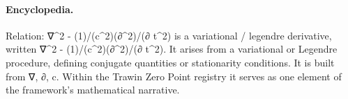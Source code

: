\paragraph{Encyclopedia.}
Relation: ∇\textasciicircum{}2 - (1)/(c\textasciicircum{}2)(∂\textasciicircum{}2)/(∂ t\textasciicircum{}2) is a variational / legendre derivative, written ∇\textasciicircum{}2 - (1)/(c\textasciicircum{}2)(∂\textasciicircum{}2)/(∂ t\textasciicircum{}2). It arises from a variational or Legendre procedure, defining conjugate quantities or stationarity conditions. It is built from ∇, ∂, c. Within the Trawin Zero Point registry it serves as one element of the framework's mathematical narrative.
